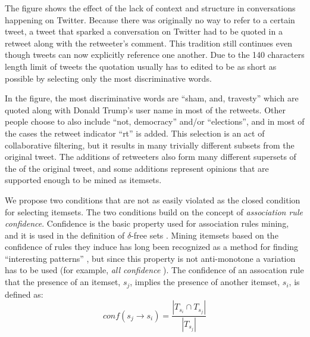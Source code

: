 \documentclass{sig-alternate}
\begin{document}
The figure shows the effect of the lack of context and structure in
conversations happening on Twitter.
Because there was originally no way to refer to a certain tweet,
a tweet that sparked a conversation on Twitter had to be quoted in a retweet
along with the retweeter's comment.
This tradition still continues even though tweets can now explicitly reference
one another. 
Due to the 140 characters length limit of tweets the quotation usually has to
edited to be as short as possible by selecting only the most discriminative
words. 

In the figure, the most discriminative words are ``sham, and, travesty''
which are quoted along with Donald Trump's user name in most of the retweets.
Other people choose to also include ``not, democracy'' and/or ``elections'',
and in most of the cases the retweet indicator ``rt'' is added. 
This selection is an act of collaborative filtering,
but it results in many trivially different subsets from the original tweet.
The additions of retweeters also form many different supersets of the of the
original tweet, and some additions represent opinions that are supported
enough to be mined as itemsets. 

We propose two conditions that are not as easily violated as the closed
condition for selecting itemsets.
The two conditions build on the concept of \emph{association rule confidence}.
Confidence is the basic property used for association rules mining,
and it is used in the definition of $\delta$-free sets \cite{boulicaut2003free}.
Mining itemsets based on the confidence of rules they induce has long been
recognized as a method for finding
``interesting patterns'' \cite{cohen2001finding},
but since this property is not anti-monotone a variation has to be used
(for example, \emph{all confidence} \cite{kim2004ccmine}).
The confidence of an assocation rule that the presence of an itemset,
$s_{j}$, implies the presence of another itemset, $s_i$, is  defined as:
\begin{equation}\label{eq:conf}conf(s_j \rightarrow s_i) = \frac{|T_{s_i} \cap T_{s_j}|}{|T_{s_j}|}\end{equation}
\end{document}
